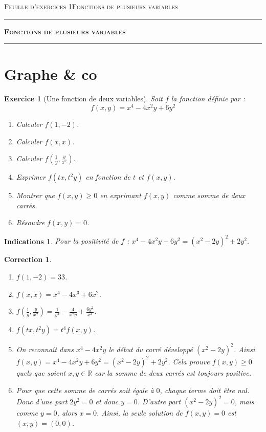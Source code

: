 \documentclass[11pt,a4paper]{article}
\newcommand{\Rr}{\mathbb{R}} \newcommand{\R}{\mathbb{R}}
\renewcommand{\ge}{\geqslant} \renewcommand{\geq}{\geqslant}
\theoremstyle{exostyle}
\newtheorem{exo}{Exercice}
\newtheorem{ind}{Indications}
\newtheorem{cor}{Correction}
\newcommand{\exercice}[1]{} \newcommand{\finexercice}{}
\newcommand{\enonce}{\begin{exo}} \newcommand{\finenonce}{\end{exo}}
\newcommand{\indication}{\begin{ind}} \newcommand{\finindication}{\end{ind}}
\newcommand{\correction}{\begin{cor}} \newcommand{\fincorrection}{\end{cor}}
\begin{document}
	
	



\textsc{Feuille d'exercices 1}\hfill\textsc{Fonctions de plusieurs variables}

\vspace*{0.5ex}
\hrule\vspace*{1.5ex} 
\hfil{\textbf{\Large \textsc{Fonctions de plusieurs variables}}}
\vspace*{1ex} \hrule 
\vspace*{5ex} 



\section{Graphe \& co}

\exercice{}
\enonce[Une fonction de deux variables]
Soit $f$ la fonction définie par :
$$f(x,y) = x^4 -4x^2y + 6y^2$$
\begin{enumerate}
	\item Calculer $f(1,-2)$.
	\item Calculer $f(x,x)$.
	\item Calculer $f\left(\frac1y,\frac{y}{x^2}\right)$.
	\item Exprimer $f(tx,t^2y)$ en fonction de $t$ et $f(x,y)$.
	\item Montrer que $f(x,y) \ge 0$ en exprimant $f(x,y)$ comme somme de deux carrés.
	\item Résoudre $f(x,y)=0$.
\end{enumerate}
\finenonce

\indication
Pour la positivité de $f$ : $x^4 -4x^2y + 6y^2 = (x^2-2y)^2 + 2y^2$.
\finindication

\correction
\begin{enumerate}
	\item $f(1,-2) = 33$.
	\item $f(x,x) = x^4 - 4x^3 + 6x^2$.
	\item $f\left(\frac1y,\frac{y}{x^2}\right) = \frac{1}{y^4} - \frac{4}{x^2y} + \frac{6y^2}{x^4}$.
	\item $f(tx,t^2y) = t^4 f(x,y)$.
	\item On reconnaît dans $x^4 -4x^2y$ le début du carré développé $(x^2-2y)^2$.
	Ainsi $f(x,y) = x^4 -4x^2y + 6y^2 = (x^2-2y)^2 + 2y^2$.
	Cela prouve $f(x,y) \ge 0$ quels que soient $x,y \in \Rr$ car la somme de deux carrés est toujours positive.
	\item Pour que cette somme de carrés soit égale à \(0\), chaque terme doit être nul.
	Donc d'une part \( 2y^2 = 0 \) et donc \( y = 0 \).
	D'autre part \( (x^2 - 2y)^2 = 0 \), mais comme \(y=0\), alors  \( x = 0 \).
	Ainsi, la seule solution de \( f(x,y) = 0 \) est \( (x,y) = (0,0) \).
\end{enumerate}
\fincorrection
\end{document}
